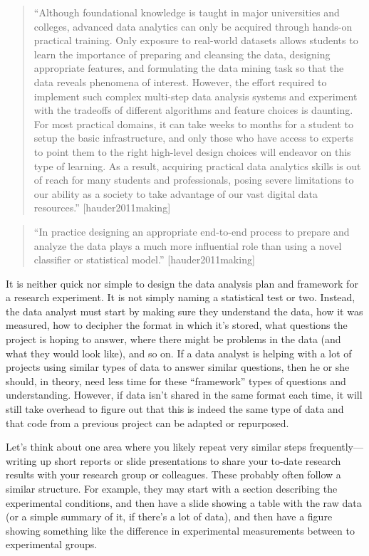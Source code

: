 \documentclass[]{tufte-book}
\begin{document}
\begin{quote}
``Although foundational knowledge is taught in major universities and colleges,
advanced data analytics can only be acquired through hands-on practical training.
Only exposure to real-world datasets allows students to learn the importance of
preparing and cleansing the data, designing appropriate features, and
formulating the data mining task so that the data reveals phenomena of interest.
However, the effort required to implement such complex multi-step data analysis
systems and experiment with the tradeoffs of different algorithms and feature
choices is daunting. For most practical domains, it can take weeks to months for
a student to setup the basic infrastructure, and only those who have access to
experts to point them to the right high-level design choices will endeavor on
this type of learning. As a result, acquiring practical data analytics skills
is out of reach for many students and professionals, posing severe limitations
to our ability as a society to take advantage of our vast digital data resources.''
{[}hauder2011making{]}
\end{quote}

\begin{quote}
``In practice designing an appropriate end-to-end process to prepare and analyze the
data plays a much more influential role than using a novel classifier or
statistical model.'' {[}hauder2011making{]}
\end{quote}

It is neither quick nor simple to design the data analysis plan and framework
for a research experiment. It is not simply naming a statistical test or two.
Instead, the data analyst must start by making sure they understand the data,
how it was measured, how to decipher the format in which it's stored, what
questions the project is hoping to answer, where there might be problems in the
data (and what they would look like), and so on. If a data analyst is helping
with a lot of projects using similar types of data to answer similar questions,
then he or she should, in theory, need less time for these ``framework'' types of
questions and understanding. However, if data isn't shared in the same format
each time, it will still take overhead to figure out that this is indeed the
same type of data and that code from a previous project can be adapted or
repurposed.

Let's think about one area where you likely repeat very similar steps
frequently---writing up short reports or slide presentations to share your
to-date research results with your research group or colleagues. These
probably often follow a similar structure. For example, they may start with
a section describing the experimental conditions, and then have a slide
showing a table with the raw data (or a simple summary of it, if there's a lot
of data), and then have a figure showing something like the difference in
experimental measurements between to experimental groups.
\end{document}
